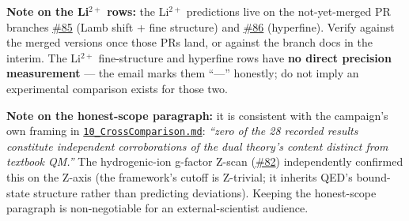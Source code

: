 \documentclass[
  11pt,
]{article}
\begin{document}
\textbf{Note on the Li\(^{2+}\) rows:} the Li\(^{2+}\) predictions live
on the not-yet-merged PR branches
\href{https://github.com/temoTxt/PyPhysics/pull/85}{\#85} (Lamb shift +
fine structure) and
\href{https://github.com/temoTxt/PyPhysics/pull/86}{\#86} (hyperfine).
Verify against the merged versions once those PRs land, or against the
branch docs in the interim. The Li\(^{2+}\) fine-structure and hyperfine
rows have \textbf{no direct precision measurement} --- the email marks
them ``---'' honestly; do not imply an experimental comparison exists
for those two.

\textbf{Note on the honest-scope paragraph:} it is consistent with the
campaign's own framing in
\href{../Quantum_Mechanics/Bethe_Salpeter/10_CrossComparison.md}{\texttt{10\_CrossComparison.md}}:
\emph{``zero of the 28 recorded results constitute independent
corroborations of the dual theory's content distinct from textbook
QM.''} The hydrogenic-ion g-factor Z-scan
(\href{https://github.com/temoTxt/PyPhysics/issues/82}{\#82})
independently confirmed this on the Z-axis (the framework's cutoff is
Z-trivial; it inherits QED's bound-state structure rather than
predicting deviations). Keeping the honest-scope paragraph is
non-negotiable for an external-scientist audience.
\end{document}
